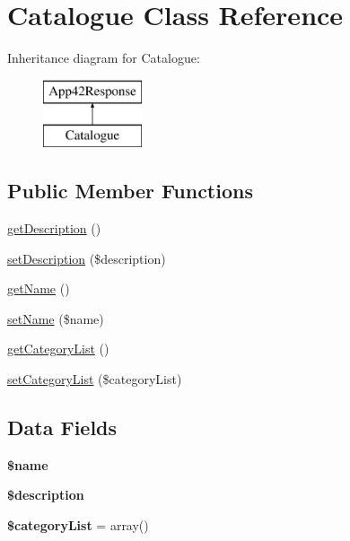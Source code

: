 \hypertarget{class_catalogue}{\section{Catalogue Class Reference}
\label{class_catalogue}
}
Inheritance diagram for Catalogue\+:\begin{figure}[H]
\begin{center}
\leavevmode
\includegraphics[height=2.000000cm]{class_catalogue}
\end{center}
\end{figure}
\subsection*{Public Member Functions}
\begin{DoxyCompactItemize}
\item 
\hyperlink{class_catalogue_a2e7bb35c71bf1824456ceb944cb7a845}{get\+Description} ()
\item 
\hyperlink{class_catalogue_a31fad3e39336ea079ea758e051866627}{set\+Description} (\$description)
\item 
\hyperlink{class_catalogue_a3d0963e68bb313b163a73f2803c64600}{get\+Name} ()
\item 
\hyperlink{class_catalogue_a2fe666694997d047711d7653eca2f132}{set\+Name} (\$name)
\item 
\hyperlink{class_catalogue_a0499d976aceb6ac19101265f37597338}{get\+Category\+List} ()
\item 
\hyperlink{class_catalogue_ac7ec00d9b76cdebaeae872476e60417b}{set\+Category\+List} (\$category\+List)
\end{DoxyCompactItemize}
\subsection*{Data Fields}
\begin{DoxyCompactItemize}
\item 
\hypertarget{class_catalogue_ab2fc40d43824ea3e1ce5d86dee0d763b}{{\bfseries \$name}}\label{class_catalogue_ab2fc40d43824ea3e1ce5d86dee0d763b}

\item 
\hypertarget{class_catalogue_a87b032cba06009e3467abf1c8018d960}{{\bfseries \$description}}\label{class_catalogue_a87b032cba06009e3467abf1c8018d960}

\item 
\hypertarget{class_catalogue_aaddabbc3242c5e392d8c8e63380ed920}{{\bfseries \$category\+List} = array()}\label{class_catalogue_aaddabbc3242c5e392d8c8e63380ed920}

\end{DoxyCompactItemize}



